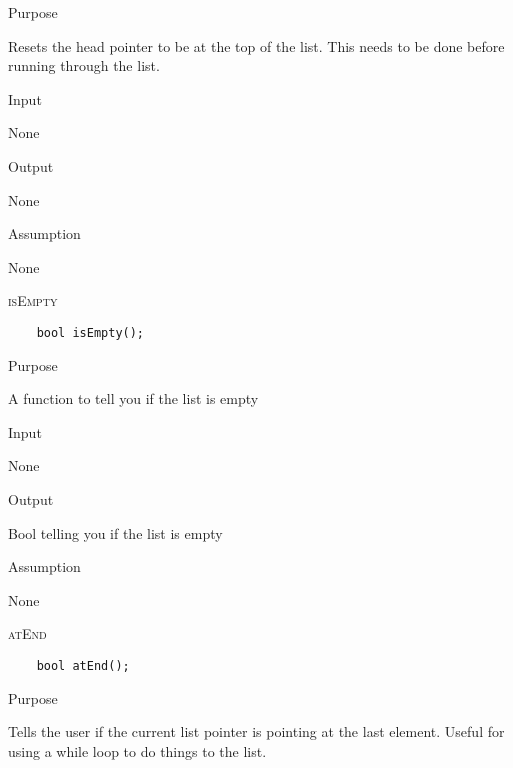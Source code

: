 \documentclass[pdftex, 11pt]{article}
\begin{document}
\begin{description}
		\begin{description}

			\item{Purpose}

				Resets the head pointer to be at the top of the list. This needs to be done before running through the
				list.

			\item{Input}

				None

			\item{Output}

				None

			\item{Assumption}

				None

		\end{description}

	\item{\textsc{isEmpty}}
\begin{lstlisting}
	bool isEmpty();
\end{lstlisting}

		\begin{description}

			\item{Purpose}

				A function to tell you if the list is empty

			\item{Input}

				None

			\item{Output}

				Bool telling you if the list is empty

			\item{Assumption}

				None

		\end{description}

	\item{\textsc{atEnd}}
\begin{lstlisting}
	bool atEnd();
\end{lstlisting}

		\begin{description}

			\item{Purpose}

				Tells the user if the current list pointer is pointing at the last element. Useful for using a while
				loop to do things to the list.


\end{description}
\end{description}
\end{document}
